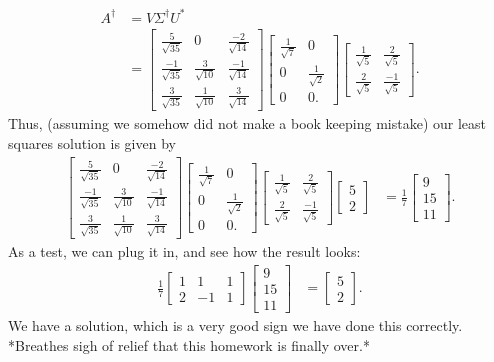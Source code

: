 \documentclass[10pt,a4paper]{article}
\theoremstyle{definition}
\begin{document}
\begin{align*}
A^\dagger &= V \Sigma^\dagger U^*\\
&= \begin{bmatrix}
\frac{5}{\sqrt{35}} & 0 & \frac{-2}{\sqrt{14}}\\
\frac{-1}{\sqrt{35}} & \frac{3}{\sqrt{10}} & \frac{-1}{\sqrt{14}}\\
\frac{3}{\sqrt{35}} &  \frac{1}{\sqrt{10}} & \frac{3}{\sqrt{14}}
\end{bmatrix} \begin{bmatrix}
\frac{1}{\sqrt{7}} & 0\\
0 & \frac{1}{\sqrt{2}}\\
0 & 0.
\end{bmatrix} \begin{bmatrix}
\frac{1}{\sqrt{5}} & \frac{2}{\sqrt{5}}\\
\frac{2}{\sqrt{5}} & \frac{-1}{\sqrt{5}}
\end{bmatrix}.
\end{align*}
Thus, (assuming we somehow did not make a book keeping mistake) our least squares solution is given by
\begin{align*}
\begin{bmatrix}
\frac{5}{\sqrt{35}} & 0 & \frac{-2}{\sqrt{14}}\\
\frac{-1}{\sqrt{35}} & \frac{3}{\sqrt{10}} & \frac{-1}{\sqrt{14}}\\
\frac{3}{\sqrt{35}} &  \frac{1}{\sqrt{10}} & \frac{3}{\sqrt{14}}
\end{bmatrix} \begin{bmatrix}
\frac{1}{\sqrt{7}} & 0\\
0 & \frac{1}{\sqrt{2}}\\
0 & 0.
\end{bmatrix} \begin{bmatrix}
\frac{1}{\sqrt{5}} & \frac{2}{\sqrt{5}}\\
\frac{2}{\sqrt{5}} & \frac{-1}{\sqrt{5}}
\end{bmatrix} \begin{bmatrix}
5\\
2
\end{bmatrix} &= \frac{1}{7} \begin{bmatrix}
9\\
15\\
11
\end{bmatrix}.
\end{align*}
As a test, we can plug it in, and see how the result looks:
\begin{align*}
\frac{1}{7} \begin{bmatrix}
1 & 1 & 1\\
2 & -1 & 1
\end{bmatrix} \begin{bmatrix}
9\\
15\\
11
\end{bmatrix} &= \begin{bmatrix}
5\\
2
\end{bmatrix}.
\end{align*}
We have a solution, which is a very good sign we have done this correctly. *Breathes sigh of relief that this homework is finally over.*
\end{document}
